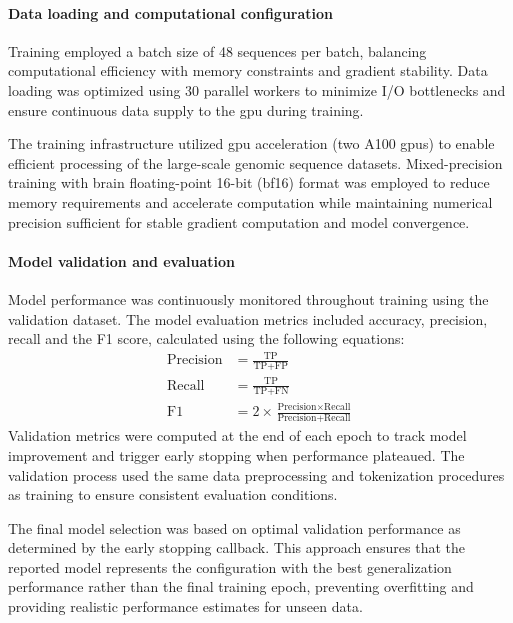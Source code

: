 \documentclass[pdflatex,sn-nature]{sn-jnl}%
\theoremstyle{thmstyleone}%
\theoremstyle{thmstyletwo}%
\theoremstyle{thmstylethree}%
\begin{document}
\paragraph{Data loading and computational configuration}
Training employed a batch size of 48 sequences per batch, balancing computational efficiency with memory constraints and gradient stability.
Data loading was optimized using 30 parallel workers to minimize I/O bottlenecks and ensure continuous data supply to the \gls{gpu} during training.

The training infrastructure utilized \gls{gpu} acceleration (two A100 \glspl{gpu}) to enable efficient processing of the large-scale genomic sequence datasets.
Mixed-precision training with brain floating-point 16-bit (bf16) format was employed to reduce memory requirements and accelerate computation while maintaining numerical precision sufficient for stable gradient computation and model convergence.

\paragraph{Model validation and evaluation}
Model performance was continuously monitored throughout training using the validation dataset.
The model evaluation metrics included accuracy, precision, recall and the F1 score, calculated using the following equations:
\begin{align*}
	\textrm{Precision} & = \frac{\textrm{TP}}{\textrm{TP}+\textrm{FP}}                                                     \\
	\textrm{Recall}    & = \frac{\textrm{TP}}{\textrm{TP}+\textrm{FN}}                                                     \\
	\textrm{F1}        & = 2 \times \frac{\textrm{Precision} \times \textrm{Recall}}{\textrm{Precision} + \textrm{Recall}}
\end{align*}
Validation metrics were computed at the end of each epoch to track model improvement and trigger early stopping when performance plateaued.
The validation process used the same data preprocessing and tokenization procedures as training to ensure consistent evaluation conditions.

The final model selection was based on optimal validation performance as determined by the early stopping callback.
This approach ensures that the reported model represents the configuration with the best generalization performance rather than the final training epoch, preventing overfitting and providing realistic performance estimates for unseen data.
\end{document}
